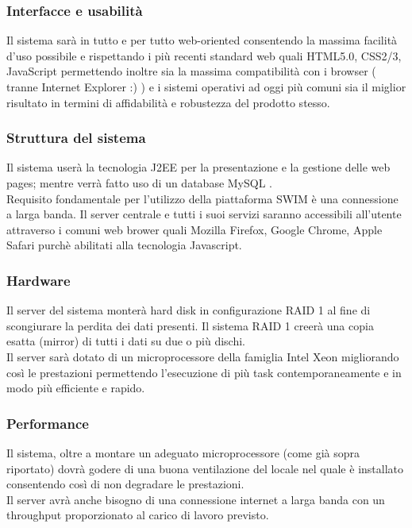 \documentclass[a4paper,12pt]{article}
\begin{document}
\subsubsection{Interfacce e usabilità}
Il sistema sarà in tutto e per tutto web-oriented consentendo la massima facilità d'uso possibile e rispettando i più recenti standard web quali HTML5.0, CSS2/3, JavaScript permettendo inoltre sia la massima compatibilità con i browser ( tranne Internet Explorer :)  ) e i sistemi operativi ad oggi più comuni sia il miglior risultato in termini di affidabilità e robustezza del prodotto stesso.
\\[1.5em]
\subsubsection{Struttura del sistema}
Il sistema userà la tecnologia J2EE per la presentazione e la gestione delle web pages; mentre verrà fatto uso di un database MySQL . \\[1\baselineskip]
Requisito fondamentale per l'utilizzo della piattaforma SWIM è una connessione a larga banda. Il server centrale e tutti i suoi servizi saranno accessibili all'utente attraverso i comuni web brower quali Mozilla Firefox, Google Chrome, Apple Safari purchè abilitati alla tecnologia Javascript.
\\[1.5em]
\subsubsection{Hardware}
Il server del sistema monterà hard disk in configurazione RAID 1 al fine di scongiurare la perdita dei dati presenti. Il sistema RAID 1 creerà una copia esatta (mirror) di tutti i dati su due o più dischi. \\[1\baselineskip]
Il server sarà dotato di un microprocessore della famiglia Intel Xeon migliorando così le prestazioni permettendo l'esecuzione di più task contemporaneamente e in modo più efficiente e rapido.
\\[1.5em]
\subsubsection{Performance}
Il sistema, oltre a montare un adeguato microprocessore (come già sopra riportato) dovrà godere di una buona ventilazione del locale nel quale è installato consentendo così di non degradare le prestazioni. \\[1\baselineskip]
Il server avrà anche bisogno di una connessione internet a larga banda con un throughput proporzionato al carico di lavoro previsto.
\vfill{}
\clearpage
\end{document}
